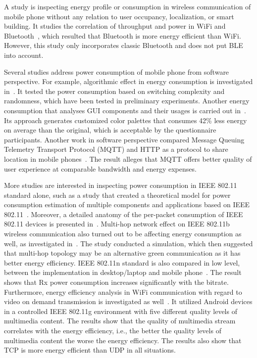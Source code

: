 \documentclass[journal]{vgtc}                %
\begin{document}
A study is inspecting energy profile or consumption in wireless communication of mobile phone without any relation to user occupancy, localization, or smart building. It studies the correlation of throughput and power in WiFi and Bluetooth~\cite{Friedman2013}, which resulted that Bluetooth is more energy efficient than WiFi. However, this study only incorporates classic Bluetooth and does not put BLE into account.

Several studies address power consumption of mobile phone from software perspective. For example, algorithmic effect in energy consumption is investigated in~\cite{Jain2005}. It tested the power consumption based on switching complexity and randomness, which have been tested in preliminary experiments. Another energy consumption that analyses GUI components and their usages is carried out in~\cite{Bernal-cardenas2015}. Its approach generates customized color palettes that consumes 42\% less energy on average than the original, which is acceptable by the questionnaire participants. Another work in software perspective compared Message Queuing Telemetry Transport Protocol (MQTT) and HTTP as a protocol to share location in mobile phones~\cite{Vergara2013}. The result alleges that MQTT offers better quality of user experience at comparable bandwidth and energy expenses.

More studies are interested in inspecting power consumption in IEEE 802.11 standard alone, such as a study that created a theoretical model for power consumption estimation of multiple components and applications based on IEEE 802.11~\cite{Marcu2011}. Moreover, a detailed anatomy of the per-packet consumption of IEEE 802.11 devices is presented in~\cite{Garcia-Saavedra2012}. Multi-hop network effect on IEEE 802.11b wireless communication also turned out to be affecting energy consumption as well, as investigated in~\cite{Nasaruddin2013}. The study conducted a simulation, which then suggested that multi-hop topology may be an alternative green communication as it has better energy efficiency. IEEE 802.11n standard is also compared in low level, between the implementation in desktop/laptop and mobile phone~\cite{Warty2012}. The result shows that Rx power consumption increases significantly with the bitrate. Furthermore, energy efficiency analysis in WiFi communication with regard to video on demand transmission is investigated as well~\cite{Trestian2012}. It utilized Android devices in a controlled IEEE 802.11g environment with five different quality levels of multimedia content. The results show that the quality of multimedia stream correlates with the energy efficiency, i.e., the better the quality levels of multimedia content the worse the energy efficiency. The results also show that TCP is more energy efficient than UDP in all situations.
\end{document}

